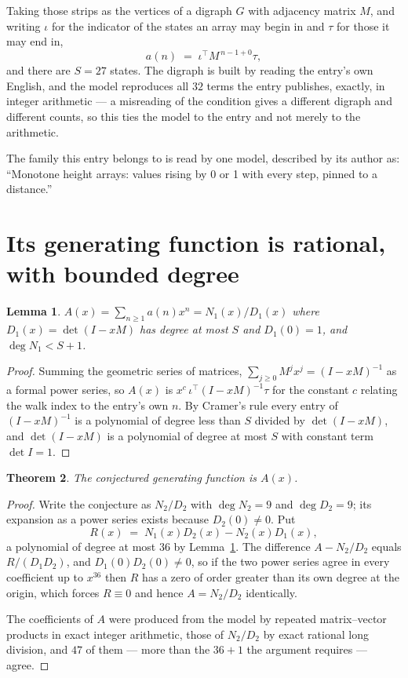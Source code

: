 \documentclass[11pt,a4paper]{article}
\theoremstyle{plain}
\newtheorem{theorem}{Theorem}
\newtheorem{lemma}[theorem]{Lemma}
\theoremstyle{definition}
\begin{document}
Taking those strips as the vertices of a digraph $G$ with adjacency matrix $M$, and writing
$\iota$ for the indicator of the states an array may begin in and $\tau$ for those it may end
in,
\[
a(n)\;=\;\iota^{\!\top}M^{\,n-1+0}\tau ,
\]
and there are $S=27$ states. The digraph is built by reading the entry's own English, and the
model reproduces all $32$ terms the entry publishes, exactly, in integer arithmetic --- a
misreading of the condition gives a different digraph and different counts, so this ties the
model to the entry and not merely to the arithmetic.

The family this entry belongs to is read by one model, described by its author as: ``Monotone height arrays: values rising by 0 or 1 with every step, pinned to a distance.''


\section{Its generating function is rational, with bounded degree}

\begin{lemma}\label{lem:rat}
$A(x)=\sum_{n\ge1}a(n)x^n=N_1(x)/D_1(x)$ where $D_1(x)=\det(I-xM)$ has degree at most
$S$ and $D_1(0)=1$, and $\deg N_1<S+1$.
\end{lemma}

\begin{proof}
Summing the geometric series of matrices, $\sum_{j\ge0}M^jx^j=(I-xM)^{-1}$ as a formal
power series, so $A(x)$ is $x^{c}\,\iota^{\!\top}(I-xM)^{-1}\tau$ for the constant $c$
relating the walk index to the entry's own $n$. By Cramer's rule every entry of
$(I-xM)^{-1}$ is a polynomial of degree less than $S$ divided by $\det(I-xM)$, and
$\det(I-xM)$ is a polynomial of degree at most $S$ with constant term $\det I=1$.
\end{proof}

\begin{theorem}
The conjectured generating function is $A(x)$.
\end{theorem}

\begin{proof}
Write the conjecture as $N_2/D_2$ with $\deg N_2=9$ and $\deg D_2=9$; its expansion as a
power series exists because $D_2(0)\neq0$. Put
\[
R(x)\;=\;N_1(x)D_2(x)-N_2(x)D_1(x),
\]
a polynomial of degree at most $36$ by Lemma~\ref{lem:rat}. The difference
$A-N_2/D_2$ equals $R/(D_1D_2)$, and $D_1(0)D_2(0)\neq0$, so if the two power series agree in
every coefficient up to $x^{36}$ then $R$ has a zero of order greater than its own
degree at the origin, which forces $R\equiv0$ and hence $A=N_2/D_2$ identically.

The coefficients of $A$ were produced from the model by repeated matrix--vector products in
exact integer arithmetic, those of $N_2/D_2$ by exact rational long division, and $47$
of them --- more than the $36+1$ the argument requires --- agree.
\end{proof}
\end{document}
